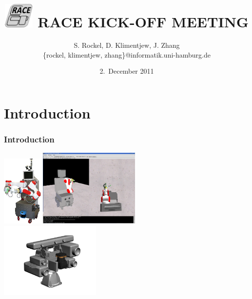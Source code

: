 \documentclass[t]{beamer}
\title[RACE KICK-OFF MEETING]			%
{\includegraphics[width=1.5cm]{img/RACE-Logo-Slanting-PROPOSAL-grayscale.pdf} RACE KICK-OFF MEETING}
\author[S.~Rockel, D.~Klimentjew, J.~Zhang]{{S. Rockel, D. Klimentjew, J. Zhang}\\ \small{\{rockel, klimentjew, zhang\}@informatik.uni-hamburg.de}}
\date[2-december-2011]			%
  {2.~December 2011}
\begin{document}

\frame{\titlepage}


\begin{frame}
 \frametitle{\tocName}
\tableofcontents

\end{frame}


\section{Introduction}
\begin{frame}
  \frametitle{Introduction}
\includegraphics[width=2cm]{img/taser.jpg}
\hspace{5ex}
\includegraphics[width=5cm]{img/TASER_simulator1.png} \\
\vspace{-6ex}
\hspace{33ex}\includegraphics[width=5cm]{img/ActivePerceptionStereoHead_Top_Front.png}
\end{frame}
\end{document}
